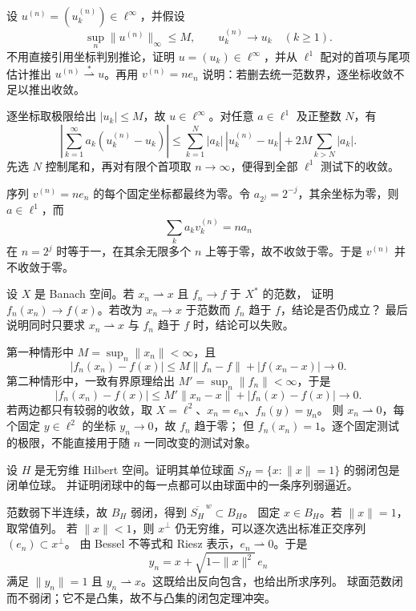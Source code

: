 \begin{exercise}\label{b1:ex:09-weak-star-coordinate-test}
设 \(u^{(n)}=(u_k^{(n)})\in\ell^\infty\)，并假设
\[
 \sup_n\|u^{(n)}\|_\infty\leq M,
 \qquad u_k^{(n)}\longrightarrow u_k\quad(k\geq1).
\]
不用直接引用坐标判别推论，证明 \(u=(u_k)\in\ell^\infty\)，并从 \(\ell^1\) 配对的首项与尾项估计推出 \(u^{(n)}\overset{*}{\rightharpoonup}u\)。再用 \(v^{(n)}=ne_n\) 说明：若删去统一范数界，逐坐标收敛不足以推出\WeakStar{}收敛。
\end{exercise}
\begin{solution}
逐坐标取极限给出 \(|u_k|\leq M\)，故 \(u\in\ell^\infty\)。对任意 \(a\in\ell^1\) 及正整数 \(N\)，有
\[
 \left|\sum_{k=1}^{\infty}a_k(u_k^{(n)}-u_k)\right|
 \leq\sum_{k=1}^N|a_k|\,|u_k^{(n)}-u_k|
     +2M\sum_{k>N}|a_k|.
\]
先选 \(N\) 控制尾和，再对有限个首项取 \(n\to\infty\)，便得到全部 \(\ell^1\) 测试下的收敛。

序列 \(v^{(n)}=ne_n\) 的每个固定坐标都最终为零。令 \(a_{2^j}=2^{-j}\)，其余坐标为零，则 \(a\in\ell^1\)，而
\[
 \sum_k a_kv_k^{(n)}=na_n
\]
在 \(n=2^j\) 时等于一，在其余无限多个 \(n\) 上等于零，故不收敛于零。于是 \(v^{(n)}\) 并不\WeakStar{}收敛于零。
\end{solution}

\begin{exercise}\label{b1:ex:09-varying-tests}
设 \(X\) 是 Banach 空间。若 \(x_n\rightharpoonup x\) 且 \(f_n\to f\) 于 \(X^*\) 的范数，
证明 \(f_n(x_n)\to f(x)\)。若改为 \(x_n\to x\) 于范数而 \(f_n\) \WeakStar{}趋于 \(f\)，结论是否仍成立？
最后说明同时只要求 \(x_n\rightharpoonup x\) 与 \(f_n\) \WeakStar{}趋于 \(f\) 时，结论可以失败。
\end{exercise}
\begin{solution}
第一种情形中 \(M=\sup_n\|x_n\|<\infty\)，且
\[
 |f_n(x_n)-f(x)|\leq M\|f_n-f\|+|f(x_n-x)|\longrightarrow0.
\]
第二种情形中，一致有界原理给出 \(M'=\sup_n\|f_n\|<\infty\)，于是
\[
 |f_n(x_n)-f(x)|\leq M'\|x_n-x\|+|f_n(x)-f(x)|\longrightarrow0.
\]
若两边都只有较弱的收敛，取 \(X=\ell^2\)、\(x_n=e_n\)、\(f_n(y)=y_n\)。
则 \(x_n\rightharpoonup0\)，每个固定 \(y\in\ell^2\) 的坐标 \(y_n\to0\)，故 \(f_n\) \WeakStar{}趋于零；
但 \(f_n(x_n)=1\)。逐个固定测试的极限，不能直接用于随 \(n\) 一同改变的测试对象。
\end{solution}

\begin{exercise}\label{b1:ex:09-sphere-closure}
设 \(H\) 是无穷维 Hilbert 空间。证明其单位球面 \(S_H=\{x:\|x\|=1\}\) 的弱闭包是闭单位球。
并证明闭球中的每一点都可以由球面中的一条序列弱逼近。
\end{exercise}
\begin{solution}
范数弱下半连续，故 \(B_H\) 弱闭，得到 \(\overline{S_H}^{\,w}\subset B_H\)。
固定 \(x\in B_H\)。若 \(\|x\|=1\)，取常值列。
若 \(\|x\|<1\)，则 \(x^\perp\) 仍无穷维，可以逐次选出标准正交序列 \((e_n)\subset x^\perp\)。
由 Bessel 不等式和 Riesz 表示，\(e_n\rightharpoonup0\)。于是
\[
 y_n=x+\sqrt{1-\|x\|^2}\,e_n
\]
满足 \(\|y_n\|=1\) 且 \(y_n\rightharpoonup x\)。这既给出反向包含，也给出所求序列。
球面范数闭而不弱闭；它不是凸集，故不与凸集的闭包定理冲突。
\end{solution}

